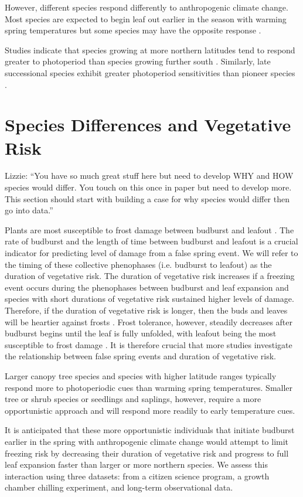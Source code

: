 \documentclass{article}\usepackage[]{graphicx}\usepackage[]{color}
\begin{document}
However, different species respond differently to anthropogenic climate change. Most species are expected to begin leaf out earlier in the season with warming spring temperatures but some species may have the opposite response \citep{Xin2016, Cleland2006, Yu2010}.

Studies indicate that species growing at more northern latitudes tend to respond greater to photoperiod than species growing further south \citep{Caffarra2011}. Similarly, late successional species exhibit greater photoperiod sensitivities than pioneer species \citep{Basler2012}. 

\section*{Species Differences and Vegetative Risk}
Lizzie: ``You have so much great stuff here but need to develop WHY and HOW species would differ. You touch on this once in paper but need to develop more. This section should start with building a case for why species would differ then go into data.''

Plants are most susceptible to frost damage between budburst and leafout \citep{Lenz2016, Vitasse2014, Augspurger2009}. The rate of budburst and the length of time between budburst and leafout is a crucial indicator for predicting level of damage from a false spring event. We will refer to the timing of these collective phenophases (i.e. budburst to leafout) as the duration of vegetative risk. The duration of vegetative risk increases if a freezing event occurs during the phenophases between budburst and leaf expansion and species with short durations of vegetative risk sustained higher levels of damage. Therefore, if the duration of vegetative risk is longer, then the buds and leaves will be heartier against frosts \citep{Augspurger2009}. Frost tolerance, however, steadily decreases after budburst begins until the leaf is fully unfolded, with leafout being the most susceptible to frost damage \citep{Lenz2016}. It is therefore crucial that more studies investigate the relationship between false spring events and duration of vegetative risk. 

Larger canopy tree species and species with higher latitude ranges typically respond more to photoperiodic cues than warming spring temperatures. Smaller tree or shrub species or seedlings and saplings, however, require a more opportunistic approach and will respond more readily to early temperature cues. 

It is anticipated that these more opportunistic individuals that initiate budburst earlier in the spring with anthropogenic climate change would attempt to limit freezing risk by decreasing their duration of vegetative risk and progress to full leaf expansion faster than larger or more northern species. We assess this interaction using three datasets: from a citizen science program, a growth chamber chilling experiment, and long-term observational data. 
\end{document}
